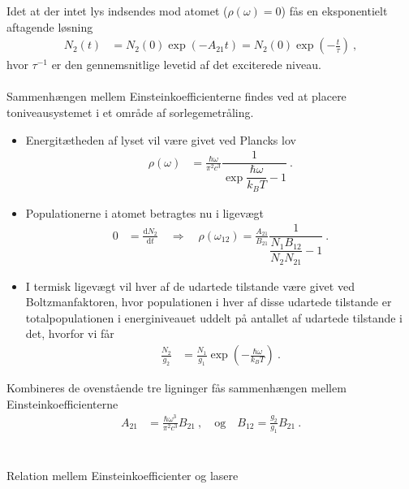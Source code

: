 Idet at der intet lys indsendes mod atomet ($\rho(\omega) = 0$) fås en eksponentielt aftagende løsning
\begin{align*}
    N_2(t) &= N_2(0)\exp(-A_{21}t) = N_2(0)\exp\left(-\frac{t}{\tau}\right) \: ,
\end{align*}
hvor $\tau^{-1}$ er den gennemsnitlige levetid af det exciterede niveau.\\\\
%
Sammenhængen mellem Einsteinkoefficienterne findes ved at placere toniveausystemet i et område af sorlegemetråling.
\begin{itemize}
    \item Energitætheden af lyset vil være givet ved Plancks lov
    \begin{align*}
        \rho(\omega) &= \frac{\hbar\omega}{\pi^2c^3} \dfrac{1}{\exp{\dfrac{\hbar\omega}{k_B T}} - 1} \: .
    \end{align*}
    \item Populationerne i atomet betragtes nu i ligevægt
    \begin{align*}
        0 &= \frac{\text{d} N_2}{\text{d} t} \quad \Rightarrow \quad \rho(\omega_{12}) = \frac{A_{21}}{B_{21}} \dfrac{1}{\dfrac{N_1 B_{12}}{N_2 N_{21}} - 1} \: .
    \end{align*}
    \item I termisk ligevægt vil hver af de udartede tilstande være givet ved Boltzmanfaktoren, hvor populationen i hver af disse udartede tilstande er totalpopulationen i energiniveauet uddelt på antallet af udartede tilstande i det, hvorfor vi får
    \begin{align*}
        \frac{N_2}{g_2} &= \frac{N_1}{g_1}\exp\left(-\frac{\hbar \omega}{k_B T}\right) \: .
    \end{align*}
\end{itemize}
Kombineres de ovenstående tre ligninger fås sammenhængen mellem Einsteinkoefficienterne
\begin{align*}
    A_{21} & =\frac{\hbar\omega^3}{\pi^2c^3} B_{21} \: , \quad \text{og} \quad B_{12} = \frac{g_2}{g_1} B_{21} \: .
\end{align*}\\\\
%
Relation mellem Einsteinkoefficienter og lasere
